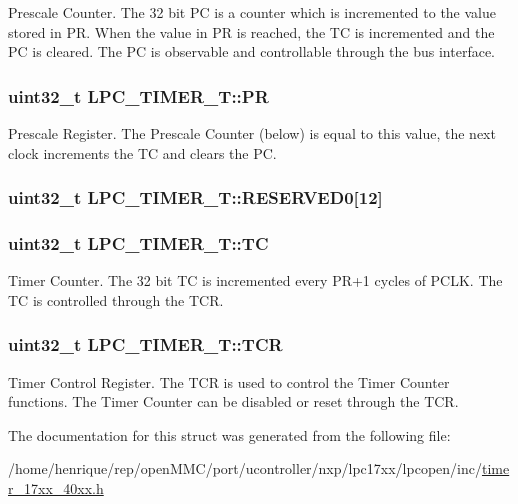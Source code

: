 Prescale Counter. The 32 bit P\-C is a counter which is incremented to the value stored in P\-R. When the value in P\-R is reached, the T\-C is incremented and the P\-C is cleared. The P\-C is observable and controllable through the bus interface. \hypertarget{structLPC__TIMER__T_ab803475dcfb9c751b2b8d02f02cb9d95}{
\subsubsection[{P\-R}]{ uint32\-\_\-t L\-P\-C\-\_\-\-T\-I\-M\-E\-R\-\_\-\-T\-::\-P\-R}}\label{structLPC__TIMER__T_ab803475dcfb9c751b2b8d02f02cb9d95}
Prescale Register. The Prescale Counter (below) is equal to this value, the next clock increments the T\-C and clears the P\-C. \hypertarget{structLPC__TIMER__T_ac55f208ad800371ff9db0ba9f49ec716}{
\subsubsection[{R\-E\-S\-E\-R\-V\-E\-D0}]{ uint32\-\_\-t L\-P\-C\-\_\-\-T\-I\-M\-E\-R\-\_\-\-T\-::\-R\-E\-S\-E\-R\-V\-E\-D0\mbox{[}12\mbox{]}}}\label{structLPC__TIMER__T_ac55f208ad800371ff9db0ba9f49ec716}
\hypertarget{structLPC__TIMER__T_ac92507831988bc15ddc0fbc30ab31bf9}{
\subsubsection[{T\-C}]{ uint32\-\_\-t L\-P\-C\-\_\-\-T\-I\-M\-E\-R\-\_\-\-T\-::\-T\-C}}\label{structLPC__TIMER__T_ac92507831988bc15ddc0fbc30ab31bf9}
Timer Counter. The 32 bit T\-C is incremented every P\-R+1 cycles of P\-C\-L\-K. The T\-C is controlled through the T\-C\-R. \hypertarget{structLPC__TIMER__T_ab6f7507a9fa9ac19e6ffb35f766027bb}{
\subsubsection[{T\-C\-R}]{ uint32\-\_\-t L\-P\-C\-\_\-\-T\-I\-M\-E\-R\-\_\-\-T\-::\-T\-C\-R}}\label{structLPC__TIMER__T_ab6f7507a9fa9ac19e6ffb35f766027bb}
Timer Control Register. The T\-C\-R is used to control the Timer Counter functions. The Timer Counter can be disabled or reset through the T\-C\-R. 

The documentation for this struct was generated from the following file\-:\begin{DoxyCompactItemize}
\item 
/home/henrique/rep/open\-M\-M\-C/port/ucontroller/nxp/lpc17xx/lpcopen/inc/\hyperlink{timer__17xx__40xx_8h}{timer\-\_\-17xx\-\_\-40xx.\-h}\end{DoxyCompactItemize}
